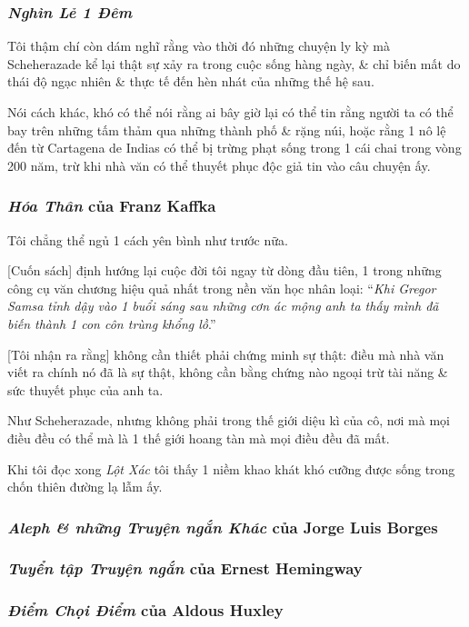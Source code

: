 \documentclass{article}
\begin{document}
\subsubsection{\textit{Nghìn Lẻ 1 Đêm}}
Tôi thậm chí còn dám nghĩ rằng vào thời đó những chuyện ly kỳ mà Scheherazade kể lại thật sự xảy ra trong cuộc sống hàng ngày, \& chỉ biến mất do thái độ ngạc nhiên \& thực tế đến hèn nhát của những thế hệ sau.

Nói cách khác, khó có thể nói rằng ai bây giờ lại có thể tin rằng người ta có thể bay trên những tấm thảm qua những thành phố \& rặng núi, hoặc rằng 1 nô lệ đến từ Cartagena de Indias có thể bị trừng phạt sống trong 1 cái chai trong vòng 200 năm, trừ khi nhà văn có thể thuyết phục độc giả tin vào câu chuyện ấy.

\subsubsection{\textit{Hóa Thân} của Franz Kaffka}
Tôi chẳng thể ngủ 1 cách yên bình như trước nữa.

[Cuốn sách] định hướng lại cuộc đời tôi ngay từ dòng đầu tiên, 1 trong những công cụ văn chương hiệu quả nhất trong nền văn học nhân loại: ``\textit{Khi Gregor Samsa tỉnh dậy vào 1 buổi sáng sau những cơn ác mộng anh ta thấy mình đã biến thành 1 con côn trùng khổng lồ}.''

[Tôi nhận ra rằng] không cần thiết phải chứng minh sự thật: điều mà nhà văn viết ra chính nó đã là sự thật, không cần bằng chứng nào ngoại trừ tài năng \& sức thuyết phục của anh ta.

Như Scheherazade, nhưng không phải trong thế giới diệu kì của cô, nơi mà mọi điều đều có thể mà là 1 thế giới hoang tàn mà mọi điều đều đã mất.

Khi tôi đọc xong \textit{Lột Xác} tôi thấy 1 niềm khao khát khó cưỡng được sống trong chốn thiên đường lạ lẫm ấy.

\subsubsection{\textit{Aleph \& những Truyện ngắn Khác} của Jorge Luis Borges}

\subsubsection{\textit{Tuyển tập Truyện ngắn} của Ernest Hemingway}

\subsubsection{\textit{Điểm Chọi Điểm} của Aldous Huxley}
\end{document}
